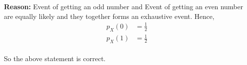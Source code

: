 \documentclass[journal,12pt,twocolumn]{IEEEtran}
\begin{document}
\begin{enumerate}
\begin{table}[htbp]
\end{table}

\textbf{Reason:} Event of getting an odd number and Event of getting an even number are equally likely and they together forms an exhaustive event.
Hence,
\begin{align}
	p_X(0) &= \frac{1}{2}\\
	p_X(1) &= \frac{1}{2}
\end{align}
\\So the above statement is correct.
\end{enumerate}
\end{document}
